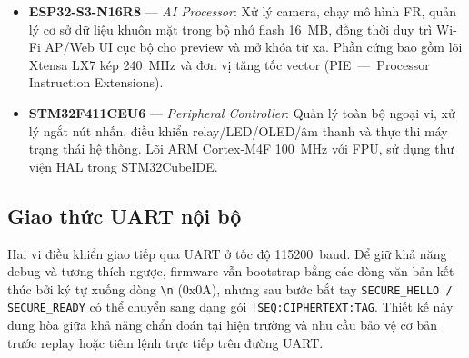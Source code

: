 \begin{itemize}
  \item \textbf{ESP32-S3-N16R8} --- \textit{AI Processor}: Xử lý camera, chạy mô hình FR, quản lý cơ sở dữ liệu khuôn mặt trong bộ nhớ flash 16~MB, đồng thời duy trì Wi-Fi AP/Web UI cục bộ cho preview và mở khóa từ xa. Phần cứng bao gồm lõi Xtensa LX7 kép 240~MHz và đơn vị tăng tốc vector (PIE\allowbreak\ ---\ Processor Instruction Extensions).
  \item \textbf{STM32F411CEU6} --- \textit{Peripheral Controller}: Quản lý toàn bộ ngoại vi, xử lý ngắt nút nhấn, điều khiển relay/LED/OLED/âm thanh và thực thi máy trạng thái hệ thống. Lõi ARM Cortex-M4F 100~MHz với FPU, sử dụng thư viện HAL trong STM32CubeIDE.
\end{itemize}

\subsection{Giao thức UART nội bộ}

Hai vi điều khiển giao tiếp qua UART ở tốc độ \SI{115200}{baud}. Để giữ khả năng debug và tương thích ngược, firmware vẫn bootstrap bằng các dòng văn bản kết thúc bởi ký tự xuống dòng \texttt{\textbackslash n} (0x0A), nhưng sau bước bắt tay \texttt{SECURE\_HELLO / SECURE\_READY} có thể chuyển sang dạng gói \texttt{!SEQ:CIPHERTEXT:TAG}. Thiết kế này dung hòa giữa khả năng chẩn đoán tại hiện trường và nhu cầu bảo vệ cơ bản trước replay hoặc tiêm lệnh trực tiếp trên đường UART.

